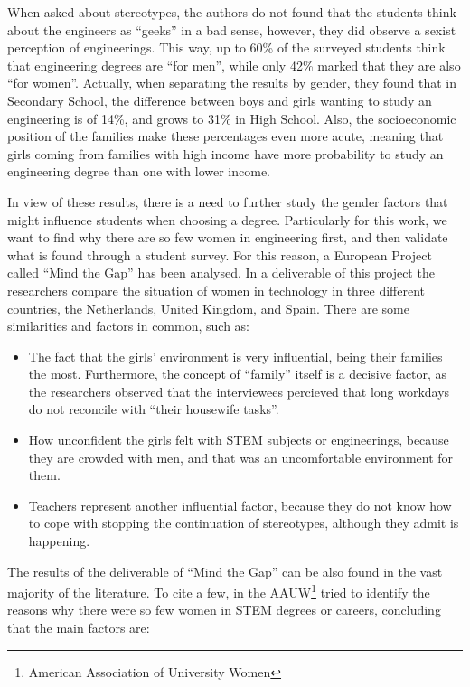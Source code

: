 \documentclass[journal,transmag]{IEEEtran}
\begin{document}
When asked about stereotypes, the authors do not found that the students think about the engineers as ``geeks'' in a bad sense, however, they did observe a sexist perception of engineerings. This way, up to 60\% of the surveyed students think that engineering degrees are ``for men'', while only 42\% marked that they are also ``for women''. Actually, when separating the results by gender, they found that in Secondary School, the difference between boys and girls wanting to study an engineering is of 14\%, and grows to 31\% in High School. Also, the socioeconomic position of the families make these percentages even more acute, meaning that girls coming from families with high income have more probability to study an engineering degree than one with lower income.

In view of these results, there is a need to further study the gender factors that might influence students when choosing a degree. Particularly for this work, we want to find why there are so few women in engineering first, and then validate what is found through a student survey. For this reason, a European Project called ``Mind the Gap'' has been analysed. In a deliverable of this project \cite{mtg2015} the researchers compare the situation of women in technology in three different countries, the Netherlands, United Kingdom, and Spain.
There are some similarities and factors in common, such as: 
\begin{itemize}
	\item The fact that the girls' environment is very influential, being their families the most. Furthermore, the concept of ``family'' itself is a decisive factor, as the researchers observed that the interviewees percieved that long workdays do not reconcile with ``their housewife tasks''.
	\item How unconfident the girls felt with STEM subjects or engineerings, because they are crowded with men, and that was an uncomfortable environment for them.
	\item Teachers represent another influential factor, because they do not know how to cope with stopping the continuation of stereotypes, although they admit is happening.
\end{itemize}

The results of the deliverable of ``Mind the Gap'' can be also found in the vast majority of the literature. To cite a few, in \cite{hill2010so} the AAUW\footnote{American Association of University Women} tried to identify the reasons why there were so few women in STEM degrees or careers, concluding that the main factors are:
\end{document}
